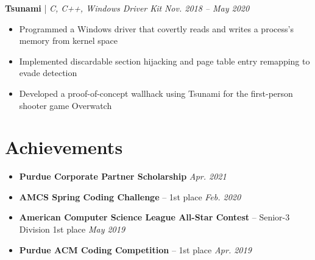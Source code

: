 \documentclass[11pt,letterpaper]{article}
\newcommand{\resumeItemListStart}{
    \begin{itemize}[itemsep=1pt, parsep=0pt, topsep=0pt]
}
\newcommand{\resumeItemListEnd}{
    \end{itemize}
}
\begin{document}
\textbf{Tsunami} | \emph{C, C++, Windows Driver Kit} \hfill \textit {Nov. 2018 -- May 2020}

\resumeItemListStart
    \item Programmed a Windows driver that covertly reads and writes a process's memory from kernel space
	\item Implemented discardable section hijacking and page table entry remapping to evade detection
	\item Developed a proof-of-concept wallhack using Tsunami for the first-person shooter game Overwatch
\resumeItemListEnd

\section{Achievements}

\resumeItemListStart
    \item \textbf{Purdue Corporate Partner Scholarship} \hfill \textit{Apr. 2021}
	\item \textbf{AMCS Spring Coding Challenge} -- 1st place \hfill \textit{Feb. 2020}
	\item \textbf{American Computer Science League All-Star Contest} -- Senior-3 Division 1st place \hfill \textit{May 2019}
	\item \textbf{Purdue ACM Coding Competition} -- 1st place \hfill \textit{Apr. 2019}
\resumeItemListEnd
	
\end{document}
